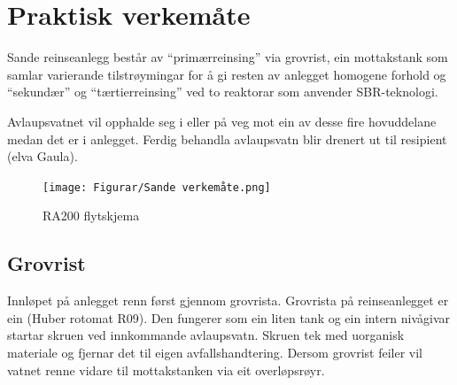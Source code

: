 \newpage
\section{Praktisk verkemåte}
\thispagestyle{fancy}

Sande reinseanlegg består av ``primærreinsing'' via grovrist, ein mottakstank 
som samlar varierande tilstrøymingar for å gi resten av anlegget homogene forhold og
``sekundær'' og ``tærtierreinsing'' ved to reaktorar som anvender \gls{SBR}-teknologi.

Avlaupsvatnet vil opphalde seg i eller på veg mot ein av desse fire hovuddelane medan det er i anlegget.
Ferdig behandla avlaupsvatn blir drenert ut til resipient (elva Gaula). 

\begin{figure}[htbp]
    \centering
    \texttt{[image: Figurar/Sande verkemåte.png]}
    \caption{\gls{RA}200 flytskjema}\label{fig:SandeVerkemaate}
\end{figure}


\subsection{Grovrist}
Innløpet på anlegget renn først gjennom grovrista. Grovrista på reinseanlegget
er ein (Huber rotomat R09). Den fungerer som ein liten tank og ein intern nivågivar startar
skruen ved innkommande avlaupsvatn. Skruen tek med uorganisk materiale og fjernar det til eigen avfallshandtering.
Dersom grovrist feiler vil vatnet renne vidare til mottakstanken via eit overløpsrøyr.

